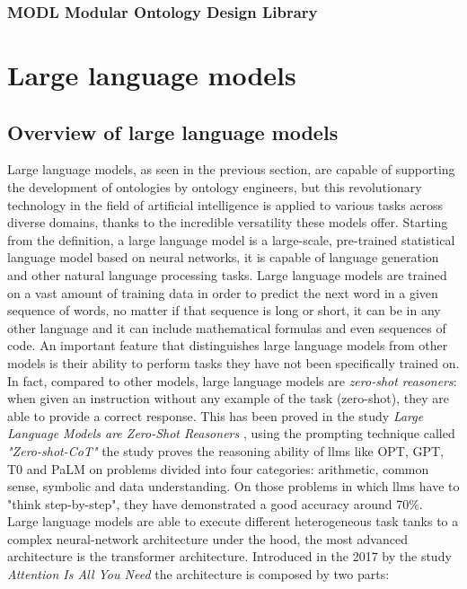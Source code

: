 \subsubsection{MODL Modular Ontology Design Library}



\newpage
\section{Large language models}
\subsection{Overview of large language models}
Large language models, as seen in the previous section, are capable of supporting the development of ontologies by ontology engineers, but this revolutionary technology in the field of artificial intelligence is applied to various tasks across diverse domains, thanks to the incredible versatility these models offer. Starting from the definition, a large language model is a large-scale, pre-trained statistical language model based on neural networks, it is capable of language generation and other natural language processing tasks.\cite{llm_wiki} Large language models are trained on a vast amount of training data in order to predict the next word in a given sequence of words, no matter if that sequence is long or short, it can be in any other language and it can include mathematical formulas and even sequences of code.\cite{llm_medium} An important feature that distinguishes large language models from other models is their ability to perform tasks they have not been specifically trained on. In fact, compared to other models, large language models are \textit{zero-shot reasoners}: when given an instruction without any example of the task (zero-shot), they are able to provide a correct response. This has been proved in the study \textit{Large Language Models are Zero-Shot Reasoners} \cite{kojima2022large}, using the prompting technique called \textit{"Zero-shot-CoT"} the study proves the reasoning ability of llms like OPT, GPT, T0 and PaLM on problems divided into four categories: arithmetic, common sense, symbolic and data understanding. On those problems in which llms have to "think step-by-step", they have demonstrated a good accuracy around 70\%.\\
Large language models are able to execute different heterogeneous task tanks to a complex neural-network architecture under the hood, the most advanced architecture is the transformer architecture. Introduced in the 2017 by the study \textit{Attention Is All You Need}\cite{vaswani2017attention} the architecture is composed by two parts:
